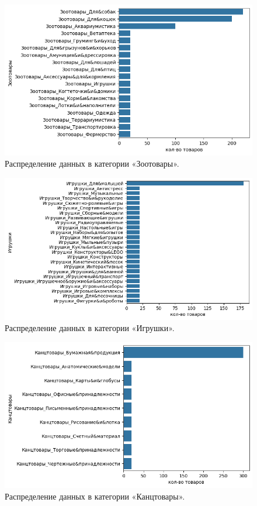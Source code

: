 \documentclass[a4paper,12pt]{extarticle}
\begin{document}
\begin{figure}[hbtp]
	\centering
	\includegraphics[scale=0.8]{приложения/amount_of_category_Зоотовары.png}
	\caption{Распределение данных в категории «Зоотовары».}
	\label{fig:amount_of_category_Зоотовары}
\end{figure}

\begin{figure}[hbtp]
	\centering
	\includegraphics[scale=0.8]{приложения/amount_of_category_Игрушки.png}
	\caption{Распределение данных в категории «Игрушки».}
	\label{fig:amount_of_category_Игрушки}
\end{figure}

\begin{figure}[hbtp]
	\centering
	\includegraphics[scale=0.8]{приложения/amount_of_category_Канцтовары.png}
	\caption{Распределение данных в категории «Канцтовары».}
	\label{fig:amount_of_category_Канцтовары}
\end{figure}
\end{document}
